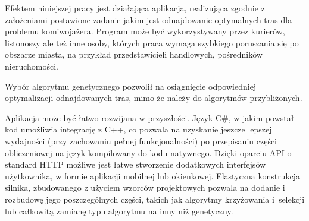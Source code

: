 Efektem niniejszej pracy jest działająca aplikacja, realizująca zgodnie z założeniami postawione zadanie jakim jest odnajdowanie optymalnych tras dla problemu komiwojażera. Program może być wykorzystywany przez kurierów, listonoszy ale też inne osoby, których praca wymaga szybkiego poruszania się po obszarze miasta, na przykład przedstawicieli handlowych, pośredników nieruchomości.

Wybór algorytmu genetycznego pozwolił na osiągnięcie odpowiedniej optymalizacji odnajdowanych tras, mimo że należy do algorytmów przybliżonych. 

Aplikacja może być łatwo rozwijana w przyszłości. Język C\#, w jakim powstał kod umożliwia integrację z C++, co pozwala na uzyskanie jeszcze lepszej wydajności (przy zachowaniu pełnej funkcjonalności) po przepisaniu części obliczeniowej na język kompilowany do kodu natywnego.
Dzięki oparciu API o standard HTTP możliwe jest łatwe stworzenie dodatkowych interfejsów użytkownika, w formie aplikacji mobilnej lub okienkowej.
Elastyczna konstrukcja silnika, zbudowanego z użyciem wzorców projektowych pozwala na dodanie i rozbudowę jego poszczególnych części, takich jak algorytmy krzyżowania i~selekcji lub całkowitą zamianę typu algorytmu na inny niż genetyczny.